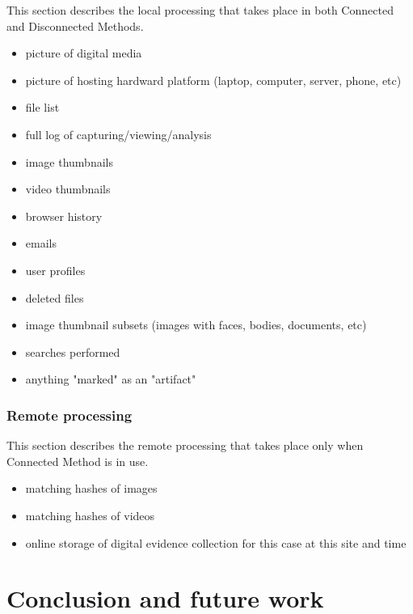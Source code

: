 \documentclass[12pt]{article}
\begin{document}
This section describes the local processing that takes place in both Connected and Disconnected Methods.
\begin{itemize}
  \item picture of digital media
  \item picture of hosting hardward platform (laptop, computer, server, phone, etc)
  \item file list
  \item full log of capturing/viewing/analysis
  \item image thumbnails
  \item video thumbnails
  \item browser history
  \item emails
  \item user profiles
  \item deleted files
  \item image thumbnail subsets (images with faces, bodies, documents, etc)
  \item searches performed
  \item anything "marked" as an "artifact"
\end{itemize}

\subsubsection{Remote processing}

This section describes the remote processing that takes place only when Connected Method is in use.
\begin{itemize}
  \item matching hashes of images
  \item matching hashes of videos
  \item online storage of digital evidence collection for this case at this site and time
\end{itemize}

\newpage
\section{Conclusion and future work}
\end{document}
